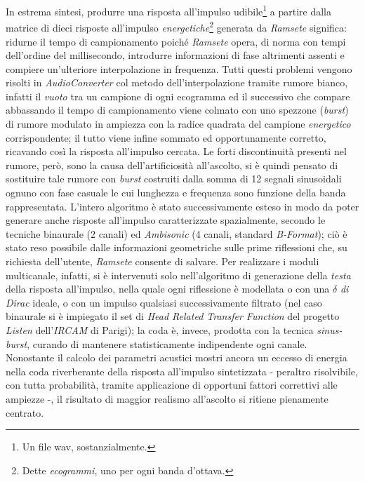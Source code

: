 \documentclass[10pt,a4paper]{article}
\begin{document}
In estrema sintesi, produrre una risposta all'impulso udibile\footnote{Un 
file \textsf{wav}, sostanzialmente.} a partire dalla matrice di dieci risposte
all'impulso \emph{energetiche}\footnote{Dette \emph{ecogrammi}, uno per ogni banda
d'ottava.} generata da \emph{Ramsete} significa: ridurne il tempo di campionamento
poich\'e \emph{Ramsete} opera, di norma con tempi dell'ordine del millisecondo,
introdurre informazioni di fase altrimenti assenti e compiere un'ulteriore interpolazione in frequenza.
Tutti questi problemi vengono risolti in \emph{AudioConverter} col metodo dell'interpolazione tramite
rumore bianco, infatti il \emph{vuoto} tra un campione di ogni ecogramma ed il successivo che compare 
abbassando il tempo di campionamento viene colmato con
uno spezzone (\emph{burst}) di rumore modulato in ampiezza con la radice quadrata del campione \emph{energetico}
corrispondente; 
il tutto viene infine sommato ed opportunamente corretto, ricavando
cos\`i la risposta all'impulso cercata. Le forti discontinuit\`a presenti nel rumore, per\`o, sono la
causa dell'artificiosit\`a all'ascolto, si \`e quindi pensato di sostituire tale rumore con \emph{burst}
costruiti dalla somma di 12 segnali sinusoidali ognuno con fase casuale le cui lunghezza e frequenza sono funzione 
della banda rappresentata. 
L'intero algoritmo \`e stato successivamente esteso in modo da poter generare anche risposte all'impulso
caratterizzate spazialmente, secondo le tecniche binaurale (2 canali) ed \emph{Ambisonic} (4 canali,
standard \emph{B-Format}); ci\`o \`e stato reso possibile dalle informazioni geometriche sulle prime
riflessioni che, su richiesta dell'utente, \emph{Ramsete} consente di salvare. Per realizzare i moduli
multicanale, infatti, si \`e intervenuti solo nell'algoritmo di generazione della \emph{testa} della
risposta all'impulso, nella quale ogni riflessione \`e modellata o con una $\delta$ \emph{di Dirac} ideale, o
con un impulso qualsiasi successivamente filtrato (nel caso binaurale si \`e impiegato il set di
\emph{Head Related Transfer Function} del progetto \emph{Listen} dell'\emph{IRCAM} di Parigi);
la coda \`e, invece, prodotta con la tecnica \emph{sinus-burst}, curando di mantenere statisticamente
indipendente ogni canale.\\
Nonostante il calcolo dei parametri acustici mostri ancora un eccesso di energia nella coda
riverberante della risposta all'impulso sintetizzata - peraltro risolvibile, con tutta probabilit\`a,
tramite applicazione di opportuni fattori correttivi alle ampiezze -, il risultato di maggior realismo 
all'ascolto si ritiene pienamente centrato.
\end{document}
